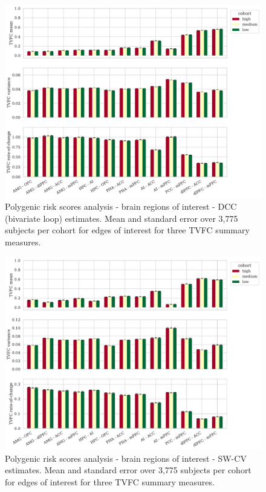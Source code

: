 \begin{figure}[h]
    \centering
    \includegraphics[width=\textwidth]{fig/ukbiobank/TVFC_predictions_summaries/pgs/cohort_comparison/ROI/correlation_all_TVFC_summary_measures_DCC_bivariate_loop_edges_of_interest}
    \caption{
        Polygenic risk scores analysis - brain regions of interest - DCC (bivariate loop) estimates.
        Mean and standard error over 3,775 subjects per cohort for edges of interest for three TVFC summary measures.
    }\label{fig:ukb-results-pgs-roi-cohort-comparison-edges-of-interest-dcc-bl}
\end{figure}


\begin{figure}[h]
    \centering
    \includegraphics[width=\textwidth]{fig/ukbiobank/TVFC_predictions_summaries/pgs/cohort_comparison/ROI/correlation_all_TVFC_summary_measures_SW_cross_validated_edges_of_interest}
    \caption{
        Polygenic risk scores analysis - brain regions of interest - SW-CV estimates.
        Mean and standard error over 3,775 subjects per cohort for edges of interest for three TVFC summary measures.
    }\label{fig:ukb-results-pgs-roi-cohort-comparison-edges-of-interest-sw-cv}
\end{figure}


